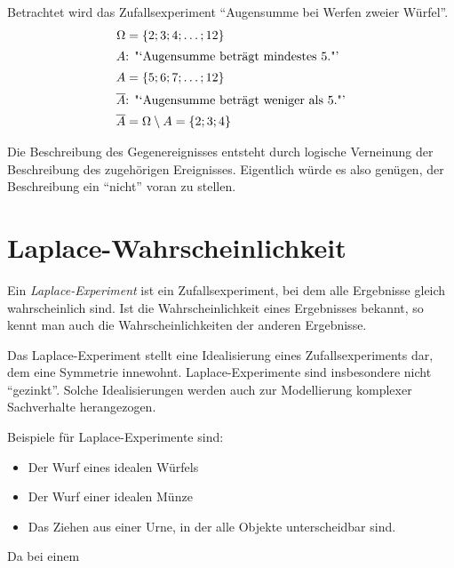 \begin{bsp}[Gegenereignis]
 Betrachtet wird das Zufallsexperiment "`Augensumme bei Werfen zweier Würfel"'.
 \begin{align*}
  \Omega &= \lbrace 2;3;4;\ldots;12\rbrace \\
  \intertext{\(A\): "`Augensumme beträgt mindestes 5."'}
   A&= \lbrace 5;6;7;\ldots;12\rbrace \\
   \intertext{\(\overline{A}\): "`Augensumme beträgt weniger als 5."'}
   \overline{A} &= \Omega \setminus A = \lbrace 2;3;4 \rbrace
 \end{align*}
  
\end{bsp}
 \begin{regel}
  Die Beschreibung des Gegenereignisses entsteht durch logische Verneinung der Beschreibung des zugehörigen Ereignisses. Eigentlich würde es also genügen, der Beschreibung ein "`nicht"' voran zu stellen.
 \end{regel}

\section{Laplace-Wahrscheinlichkeit}

\begin{defi}
Ein \emph{Laplace-Experiment} ist ein Zufallsexperiment, bei dem alle Ergebnisse gleich wahrscheinlich sind. Ist die Wahrscheinlichkeit eines Ergebnisses bekannt, so kennt man auch die Wahrscheinlichkeiten der anderen Ergebnisse.

Das Laplace-Experiment stellt eine Idealisierung eines Zufallsexperiments dar, dem eine Symmetrie innewohnt. Laplace-Experimente sind insbesondere nicht "`gezinkt"'. Solche Idealisierungen werden auch zur Modellierung komplexer Sachverhalte herangezogen.

Beispiele für Laplace-Experimente sind:
\begin{itemize}
 \item Der Wurf eines idealen Würfels
 \item Der Wurf einer idealen Münze 
 \item Das Ziehen aus einer Urne, in der alle Objekte unterscheidbar sind.
\end{itemize}
\end{defi}

\begin{defi}
 Da bei einem 
 
\end{defi}


